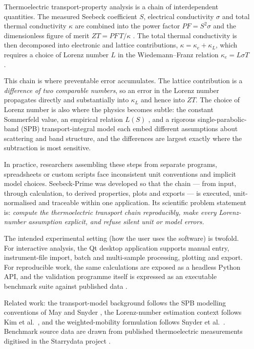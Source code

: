 \documentclass[preprint,12pt, a4paper]{elsarticle}
\begin{document}
Thermoelectric transport-property analysis is a chain of interdependent
quantities. The measured Seebeck coefficient $S$, electrical conductivity
$\sigma$ and total thermal conductivity $\kappa$ are combined into the power
factor $PF = S^{2}\sigma$ and the dimensionless figure of merit
$ZT = PF\,T/\kappa$ \cite{snyder2008,goldsmid2016}. The total thermal
conductivity is then decomposed into electronic and lattice contributions,
$\kappa = \kappa_{e} + \kappa_{L}$, which requires a choice of Lorenz number
$L$ in the Wiedemann--Franz relation $\kappa_{e} = L\sigma T$.

This chain is where preventable error accumulates. The lattice contribution is
a \emph{difference of two comparable numbers}, so an error in the Lorenz number
propagates directly and substantially into $\kappa_{L}$ and hence into $ZT$.
The choice of Lorenz number is also where the physics becomes subtle: the
constant Sommerfeld value, an empirical relation $L(S)$ \cite{kim2015}, and a
rigorous single-parabolic-band (SPB) transport-integral model
\cite{maysnyder2012} each embed different assumptions about scattering and band
structure, and the differences are largest exactly where the subtraction is
most sensitive.

In practice, researchers assembling these steps from separate programs,
spreadsheets or custom scripts face inconsistent unit conventions and implicit
model choices. Seebeck-Prime was developed so that the chain --- from input,
through calculation, to derived properties, plots and exports --- is executed,
unit-normalised and traceable within one application. Its scientific problem
statement is: \emph{compute the thermoelectric transport chain reproducibly,
make every Lorenz-number assumption explicit, and refuse silent unit or model
errors.}

The intended experimental setting (how the user uses the software) is
twofold. For interactive analysis, the Qt desktop application supports manual
entry, instrument-file import, batch and multi-sample processing, plotting and
export. For reproducible work, the same calculations are exposed as a headless
Python API, and the validation programme itself is expressed as an executable
benchmark suite against published data \cite{katsura2025}.

Related work: the transport-model background follows the SPB modelling
conventions of May and Snyder \cite{maysnyder2012}, the Lorenz-number
estimation context follows Kim et al.\ \cite{kim2015}, and the weighted-mobility
formulation follows Snyder et al.\ \cite{snyder2020}. Benchmark source data are
drawn from published thermoelectric measurements digitised in the Starrydata
project \cite{katsura2025}.
\end{document}
